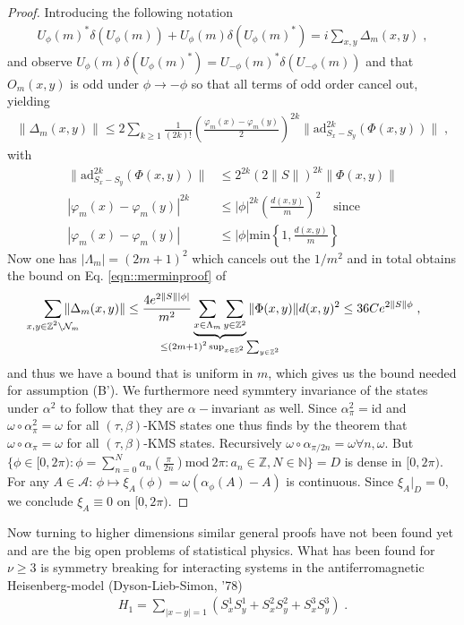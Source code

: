 \documentclass[
a4paper, %
11pt, %
onecolumn, %
openany, %
]{memoir}
\theoremstyle{definition}
\theoremstyle{remark}
\theoremstyle{plain}
\begin{document}
\begin{proof}
Introducing the following notation \begin{align}
U_{\phi}(m)^*\delta(U_{\phi}(m))+U_{\phi}(m)\delta(U_{\phi}(m)^*)=i\sum_{x,y}\Delta_m(x,y)\; ,
\end{align}
and observe $U_{\phi}(m)\delta(U_{\phi}(m)^*)=U_{-\phi}(m)^*\delta(U_{-\phi}(m))$ and  that $O_m(x,y)$ is odd under $\phi\rightarrow -\phi$ so that all terms of odd order cancel out, yielding \begin{align}
\| \Delta_m(x,y)\| \leq 2 \sum_{k\geq 1} \frac{1}{(2k)!}\left(\frac{\varphi_m(x)-\varphi_m(y)}{2}\right)^{2k} \| \mathrm{ad}_{S_x-S_y}^{2k}(\Phi(x,y))\|\; ,
\end{align}
with \begin{align}
\| \mathrm{ad}_{S_x-S_y}^{2k}(\Phi(x,y))\| &\leq 2^{2k}(2\| S\| )^{2k}\|\Phi(x,y)\|\\
|\varphi_m(x)-\varphi_m(y)|^{2k}&\leq |\phi|^{2k}\left(\frac{d(x,y)}{m}\right)^2 \quad \text{since} \\|\varphi_m(x)-\varphi_m(y)|&\leq |\phi| \text{min}\left\{1,\frac{d(x,y)}{m}\right\}
\end{align}
Now one has $|\Lambda_m|=(2m+1)^2$ which cancels out the $1/m^2$ and in total obtains the bound on Eq. \eqref{eqn::merminproof} of \begin{align}
\sum_{\mathclap{x,y\in\mathbb{Z}^2\setminus\mathcal{N}_m}}\|\Delta_m(x,y)\| \leq \frac{4 e^{2\|S\||\phi|}}{m^2}\underbrace{\sum_{x\in\Lambda_m}\sum_{y\in\mathbb{Z}^2}}_{\mathclap{\leq (2m+1)^2\sup_{x\in\mathbb{Z}^2}\sum_{y\in\mathbb{Z}^2}}}\|\Phi(x,y)\| d(x,y)^2 \leq 36 C e^{2\|S\|\phi}\; ,
\end{align}
and thus we have a bound that is uniform in $m$, which gives us the bound needed for assumption (B'). We furthermore need symmtery invariance of the states under $\alpha^2$ to follow that they are $\alpha-$invariant as well. Since $\alpha_{\pi}^2=\mathrm{id}$ and $\omega\circ \alpha_{\pi}^2=\omega$ for all $(\tau,\beta)$-KMS states one thus finds by the theorem that $\omega\circ\alpha_{\pi}=\omega$ for all $(\tau,\beta)$-KMS states. Recursively $\omega\circ\alpha_{\pi/2n}=\omega \forall n,\omega$. But $\{\phi\in[0,2\pi):\phi=\sum_{n=0}^N a_n\left(\frac{\pi}{2n}\right)\mathrm{mod}~2\pi:a_n\in\mathbb{Z}, N\in\mathbb{N}\}=D$ is dense in $[0,2\pi)$. For any $A\in\mathcal{A}$: $\phi\mapsto\xi_A(\phi)=\omega(\alpha_{\phi}(A)-A)$ is continuous. Since $\xi_A|_D=0$, we conclude $\xi_A\equiv 0$ on $[0,2\pi)$.
\end{proof}
Now turning to higher dimensions similar general proofs have not been found yet and are the big open problems of statistical physics. What has been found for $\nu\geq 3$ is symmetry breaking for interacting systems in the antiferromagnetic Heisenberg-model (Dyson-Lieb-Simon, '78) \begin{align}
H_1 = \sum_{|x-y|=1}(S_x^1S_y^1+S_x^2S_y^2+S_x^3S_y^3)\; .
\end{align}
\end{document}
